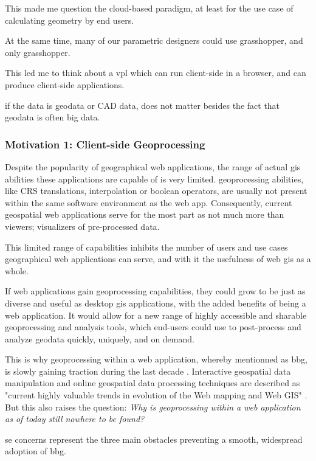 This made me question the cloud-based paradigm, at least for the use case of calculating geometry by end users. 

At the same time, many of our parametric designers could use grasshopper, and only grasshopper. 

This led me to think about a vpl which can run client-side in a browser, and can produce client-side applications.

if the data is geodata or CAD data, does not matter besides the fact that geodata is often big data.

\subsubsection{Motivation 1: Client-side Geoprocessing}

Despite the popularity of geographical web applications, the range of actual \ac{gis} abilities these applications are capable of is very limited. \ac{geoprocessing} abilities, like CRS translations, interpolation or boolean operators, are usually not present within the same software environment as the web app. Consequently, current geospatial web applications serve for the most part as not much more than viewers; visualizers of pre-processed data. 

This limited range of capabilities inhibits the number of users and use cases geographical web applications can serve, and with it the usefulness of web \ac{gis} as a whole. 

If web applications gain \ac{geoprocessing} capabilities, they could grow to be just as diverse and useful as desktop \ac{gis} applications, with the added benefits of being a web application. It would allow for a new range of highly accessible and sharable geoprocessing and analysis tools, which end-users could use to post-process and analyze geodata quickly, uniquely, and on demand.

This is why \ac{geoprocessing} within a web application, whereby mentionned as \ac{bbg}, is slowly gaining traction during the last decade \cite{kulawiak_analysis_2019, panidi_hybrid_2015, hamilton_client-side_2014}. Interactive geospatial data manipulation and online geospatial data processing techniques are described as "current highly valuable trends in evolution of the Web mapping and Web GIS" \cite{panidi_hybrid_2015}. But this also raises the question: \textit{Why is geoprocessing within a web application as of today still nowhere to be found?} 

se concerns represent the three main obstacles preventing a smooth, widespread adoption of \ac{bbg}. 

